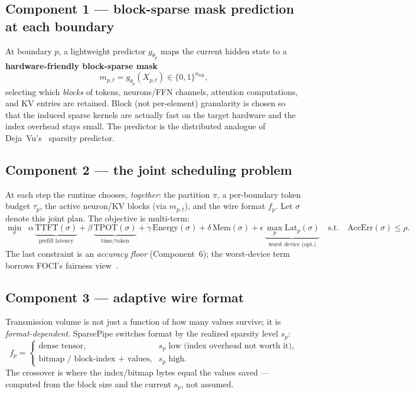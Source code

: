 \documentclass[11pt]{article}
\newcommand{\term}[1]{\textbf{\color{accent!85!black}#1}}
\begin{document}
\subsection{Component 1 --- block-sparse mask prediction at each boundary}
At boundary $p$, a lightweight predictor $g_{\theta_p}$ maps the current hidden state to a
\term{hardware-friendly block-sparse mask}
\[
m_{p,t} = g_{\theta_p}(X_{p,t}) \in \{0,1\}^{n_{\text{blk}}},
\]
selecting which \emph{blocks} of tokens, neurons/FFN channels, attention computations, and KV
entries are retained. Block (not per-element) granularity is chosen so that the induced
sparse kernels are actually fast on the target hardware and the index overhead stays small.
The predictor is the distributed analogue of Deja~Vu's~\cite{dejavu} sparsity predictor.

\subsection{Component 2 --- the joint scheduling problem}
At each step the runtime chooses, \emph{together}: the partition $\pi$, a per-boundary token
budget $\tau_p$, the active neuron/KV blocks (via $m_{p,t}$), and the wire format $f_p$. Let
$\sigma$ denote this joint plan. The objective is multi-term:
\[
\min_{\sigma}\;\;
\alpha\,\underbrace{\text{TTFT}(\sigma)}_{\text{prefill latency}}
+\beta\,\underbrace{\text{TPOT}(\sigma)}_{\text{time/token}}
+\gamma\,\text{Energy}(\sigma)
+\delta\,\text{Mem}(\sigma)
+\epsilon\,\underbrace{\max_p \text{Lat}_p(\sigma)}_{\text{worst device (opt.)}}
\quad\text{s.t.}\quad
\text{AccErr}(\sigma)\le \rho .
\]
The last constraint is an \emph{accuracy floor} (Component~6); the worst-device term borrows
FOCI's fairness view~\cite{foci}.

\subsection{Component 3 --- adaptive wire format}
Transmission volume is not just a function of how many values survive; it is
\emph{format-dependent}. SparsePipe switches format by the realized sparsity level $s_p$:
\[
f_p =
\begin{cases}
\text{dense tensor}, & s_p \text{ low (index overhead not worth it)},\\
\text{bitmap / block-index + values}, & s_p \text{ high}.
\end{cases}
\]
The crossover is where the index/bitmap bytes equal the values saved --- computed from the
block size and the current $s_p$, not assumed.
\end{document}
